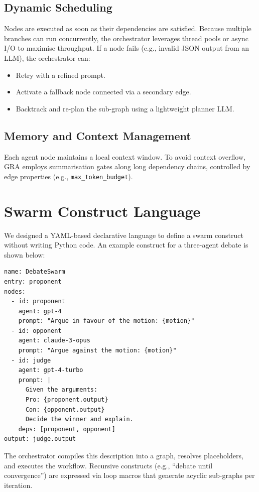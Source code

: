\documentclass[11pt]{article}
\begin{document}
\subsection{Dynamic Scheduling}
Nodes are executed as soon as their dependencies are satisfied. 
Because multiple branches can run concurrently, the orchestrator leverages thread pools or async I/O to maximise throughput. 
If a node fails (e.g., invalid JSON output from an LLM), the orchestrator can:
\begin{itemize}
    \item Retry with a refined prompt.
    \item Activate a fallback node connected via a secondary edge.
    \item Backtrack and re-plan the sub-graph using a lightweight planner LLM.
\end{itemize}

\subsection{Memory and Context Management}
Each agent node maintains a local context window. 
To avoid context overflow, GRA employs summarisation gates along long dependency chains, controlled by edge properties (e.g., \texttt{max\_token\_budget}).

\section{Swarm Construct Language}
We designed a YAML-based declarative language to define a swarm construct without writing Python code. 
An example construct for a three-agent debate is shown below:

\begin{verbatim}
name: DebateSwarm
entry: proponent
nodes:
  - id: proponent
    agent: gpt-4
    prompt: "Argue in favour of the motion: {motion}"
  - id: opponent
    agent: claude-3-opus
    prompt: "Argue against the motion: {motion}"
  - id: judge
    agent: gpt-4-turbo
    prompt: |
      Given the arguments:
      Pro: {proponent.output}
      Con: {opponent.output}
      Decide the winner and explain.
    deps: [proponent, opponent]
output: judge.output
\end{verbatim}

The orchestrator compiles this description into a graph, resolves placeholders, and executes the workflow. 
Recursive constructs (e.g., “debate until convergence”) are expressed via loop macros that generate acyclic sub-graphs per iteration.
\end{document}
